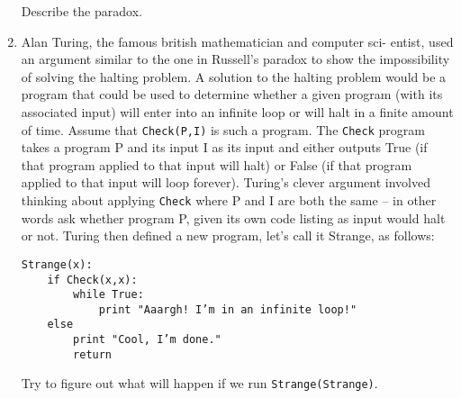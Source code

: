 \documentclass{amsart}
\begin{document}
\begin{enumerate}
Describe the paradox.

\vfill

\newpage

\item Alan Turing, the famous british mathematician and computer sci-
entist, used an argument similar to the one in Russell’s paradox to
show the impossibility of solving the halting problem.  A solution
to the halting problem would be a program that could be used to
determine whether a given program (with its associated input) will
enter into an infinite loop or will halt in a finite amount of time.
Assume that {\tt Check(P,I)} is such a program.  The {\tt Check} program
takes a program P and its input I as its input and either outputs
True (if that program applied to that input will halt) or False (if
that program applied to that input will loop forever).  Turing’s
clever argument involved thinking about applying {\tt Check} where P
and I are both the same – in other words ask whether program P,
given its own code listing as input would halt or not.
Turing then defined a new program, let’s call it Strange, as
follows:
\medskip

\begin{verbatim}
Strange(x):
    if Check(x,x):
        while True:
            print "Aaargh! I’m in an infinite loop!"
    else
        print "Cool, I’m done."
        return
\end{verbatim}
\medskip


Try to figure out what will happen if we run {\tt Strange(Strange)}.


\end{enumerate}
\end{document}
